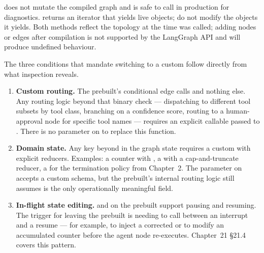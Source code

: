 \begin{warningbox}
 does not mutate the compiled graph and is safe
to call in production for diagnostics. 
returns an iterator that yields live  objects; do not
modify the objects it yields. Both methods reflect the topology at the time
 was called; adding nodes or edges after compilation is not
supported by the LangGraph API and will produce undefined behaviour.
\end{warningbox}

The three conditions that mandate switching to a custom 
follow directly from what inspection reveals.

\begin{enumerate}
  \item \textbf{Custom routing.} The prebuilt's conditional edge calls
     and nothing else. Any routing logic beyond
    that binary check --- dispatching to different tool subsets by tool
    class, branching on a confidence score, routing to a human-approval
    node for specific tool names --- requires an explicit callable passed
    to . There is no parameter on
     to replace this function.

  \item \textbf{Domain state.} Any key beyond  in the
    graph state requires a custom  with explicit
    reducers. Examples: a  counter with
    , a  with a cap-and-truncate
    reducer, a  for the termination policy from
    Chapter~2. The  parameter on
     accepts a custom schema, but the
    prebuilt's internal routing logic still assumes  is the
    only operationally meaningful field.

  \item \textbf{In-flight state editing.}  and
     on the prebuilt support pausing and resuming.
    The trigger for leaving the prebuilt is needing to call
     between an interrupt and a resume ---
    for example, to inject a corrected  or to modify an
    accumulated counter before the agent node re-executes.
    Chapter~21 \S21.4 covers this pattern.
\end{enumerate}

